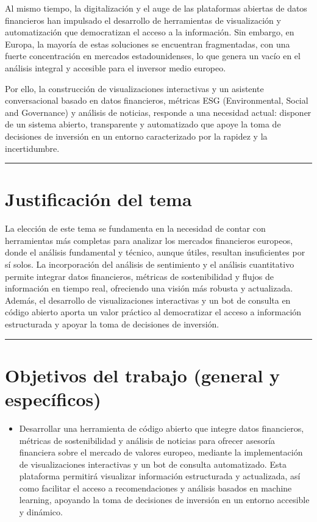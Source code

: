 \documentclass[letterpaper,10pt,spanish]{sphinxmanual}
\begin{document}
\sphinxAtStartPar
Al mismo tiempo, la digitalización y el auge de las plataformas abiertas de datos financieros han impulsado el desarrollo de herramientas de visualización y automatización que democratizan el acceso a la información. Sin embargo, en Europa, la mayoría de estas soluciones se encuentran fragmentadas, con una fuerte concentración en mercados estadounidenses, lo que genera un vacío en el análisis integral y accesible para el inversor medio europeo.

\sphinxAtStartPar
Por ello, la construcción de visualizaciones interactivas y un asistente conversacional basado en datos financieros, métricas ESG (Environmental, Social and Governance) y análisis de noticias, responde a una necesidad actual: disponer de un sistema abierto, transparente y automatizado que apoye la toma de decisiones de inversión en un entorno caracterizado por la rapidez y la incertidumbre.


\bigskip\hrule\bigskip



\section{Justificación del tema}
\label{\detokenize{Introduccion:justificacion-del-tema}}
\sphinxAtStartPar
La elección de este tema se fundamenta en la necesidad de contar con herramientas más completas para analizar los mercados financieros europeos, donde el análisis fundamental y técnico, aunque útiles, resultan insuficientes por sí solos. La incorporación del análisis de sentimiento y el análisis cuantitativo permite integrar datos financieros, métricas de sostenibilidad y flujos de información en tiempo real, ofreciendo una visión más robusta y actualizada. Además, el desarrollo de visualizaciones interactivas y un bot de consulta en código abierto aporta un valor práctico al democratizar el acceso a información estructurada y apoyar la toma de decisiones de inversión.


\bigskip\hrule\bigskip



\section{Objetivos del trabajo (general y específicos)}
\label{\detokenize{Introduccion:objetivos-del-trabajo-general-y-especificos}}
\sphinxAtStartPar
{}
\begin{itemize}
\item {} 
\sphinxAtStartPar
Desarrollar una herramienta de código abierto que integre datos financieros, métricas de sostenibilidad y análisis de noticias para ofrecer asesoría financiera sobre el mercado de valores europeo, mediante la implementación de visualizaciones interactivas y un bot de consulta automatizado. Esta plataforma permitirá visualizar información estructurada y actualizada, así como facilitar el acceso a recomendaciones y análisis basados en machine learning, apoyando la toma de decisiones de inversión en un entorno accesible y dinámico.

\end{itemize}
\end{document}
